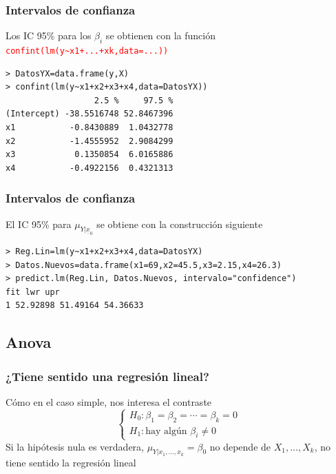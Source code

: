 \documentclass[12pt,t]{beamer}
\newcommand{\red}[1]{\textcolor{red}{#1}}
\theoremstyle{plain}
\theoremstyle{definition}
\begin{document}
\begin{frame}[fragile]
\frametitle{Intervalos de confianza}
Los IC 95\% para los $\beta_i$ se obtienen con la función \red{\tt confint(lm(y\~{}x1+...+xk,data=...))}\medskip

\begin{lstlisting}
> DatosYX=data.frame(y,X)
> confint(lm(y~x1+x2+x3+x4,data=DatosYX))
                  2.5 %     97.5 %
(Intercept) -38.5516748 52.8467396
x1           -0.8430889  1.0432778
x2           -1.4555952  2.9084299
x3            0.1350854  6.0165886
x4           -0.4922156  0.4321313
\end{lstlisting}
%
%
\end{frame}



\begin{frame}[fragile]
\frametitle{Intervalos de confianza}
El IC 95\% para $\mu_{Y|\underline{x}_0}$ se obtiene con la construcción siguiente\medskip

\begin{lstlisting}
> Reg.Lin=lm(y~x1+x2+x3+x4,data=DatosYX)
> Datos.Nuevos=data.frame(x1=69,x2=45.5,x3=2.15,x4=26.3)
> predict.lm(Reg.Lin, Datos.Nuevos, intervalo="confidence")
fit lwr upr
1 52.92898 51.49164 54.36633
\end{lstlisting}

\end{frame}




\subsection{Anova}

\begin{frame}
\frametitle{¿Tiene sentido una regresión lineal?}
Cómo en el caso simple, nos interesa el contraste
$$
\left\{\begin{array}{l} H_0: \beta_1=\beta_2=\cdots=\beta_k=0 \\
H_1: \mbox{hay algún }\beta_i \neq 0 \end{array}
\right.
$$
Si la hipótesis nula es verdadera, $\mu_{Y|x_1,\ldots,x_k}=\beta_0$ no depende de $X_1,\ldots,X_k$, no tiene sentido la regresión lineal

\end{frame}
\end{document}
